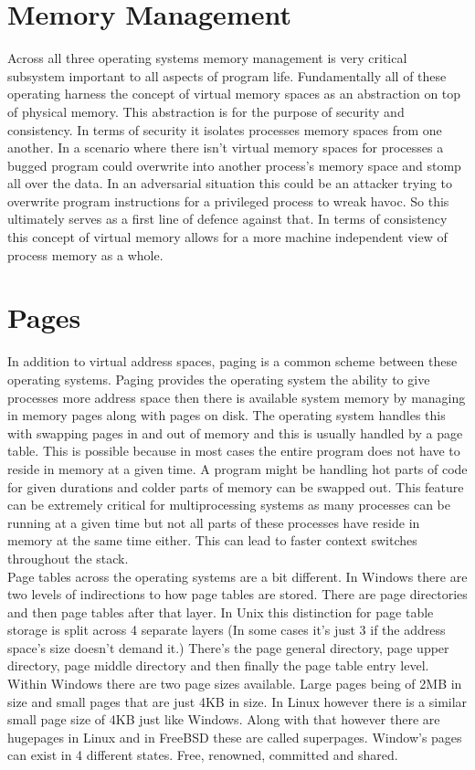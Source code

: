 \documentclass[letterpaper,10pt,draftclsnofoot,onecolumn]{IEEEtran}
\begin{document}
\section{Memory Management}
Across all three operating systems memory management is very critical subsystem important to all aspects of program life. Fundamentally all of these operating harness the concept of virtual memory spaces as an abstraction on top of physical memory. This abstraction is for the purpose of security and consistency. In terms of security it isolates processes memory spaces from one another. In a scenario where there isn’t virtual memory spaces for processes a bugged program could overwrite into another process's memory space and stomp all over the data. In an adversarial situation this could be an attacker trying to overwrite program instructions for a privileged process to wreak havoc. So this ultimately serves as a first line of defence against that. In terms of consistency this concept of virtual memory allows for a more machine independent view of process memory as a whole. \\

\section{Pages}
In addition to virtual address spaces, paging is a common scheme between these operating systems. Paging provides the operating system the ability to give processes more address space then there is available system memory by managing in memory pages along with pages on disk. The operating system handles this with swapping pages in and out of memory and this is usually handled by a page table. This is possible because in most cases the entire program does not have to reside in memory at a given time. A program might be handling hot parts of code for given durations and colder parts of memory can be swapped out. This feature can be extremely critical for multiprocessing systems as many processes can be running at a given time but not all parts of these processes have reside in memory at the same time either. This can lead to faster context switches throughout the stack.\\

Page tables across the operating systems are a bit different. In Windows there are two levels of indirections to how page tables are stored. There are page directories and then page tables after that layer. In Unix this distinction for page table storage is split across 4 separate layers (In some cases it's just 3 if the address space’s size doesn’t demand it.) There's the page general directory, page upper directory, page middle directory and then finally the page table entry level.
Within Windows there are two page sizes available. Large pages being of 2MB in size and small pages that are just 4KB in size. In Linux however there is a similar small page size of 4KB just like Windows. Along with that however there are hugepages in Linux and in FreeBSD these are called superpages. \cite{mccusick} Window’s pages can exist in 4 different states. Free, renowned, committed and shared.\\
\end{document}
